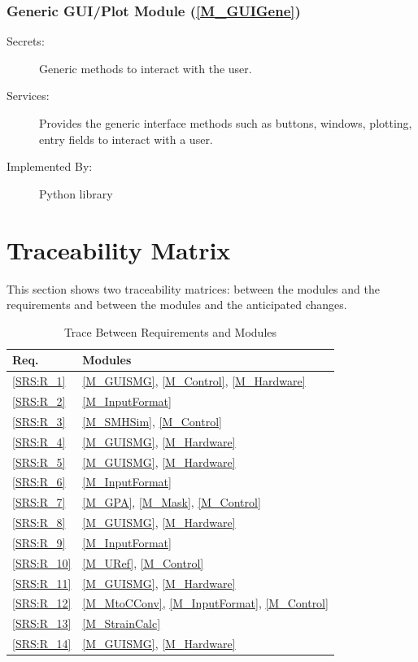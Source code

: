 \documentclass[12pt, titlepage]{article}
\begin{document}
\subsubsection{Generic GUI/Plot Module (\texorpdfstring{\cref{M_GUIGene}}))}
\label{MG_GUIGene}
\begin{description}
\item[Secrets:] Generic methods to interact with the user.
\item[Services:] Provides the generic interface methods such as buttons, 
windows, plotting, entry fields to interact with a user.
\item[Implemented By:] Python library
\end{description}

\section{Traceability Matrix} \label{SecTM}

This section shows two traceability matrices: between the modules and the
requirements and between the modules and the anticipated changes.

\begin{table}[H]
\centering
\begin{tabular}{p{} p{}}
\toprule
\textbf{Req.} & \textbf{Modules}\\
\midrule
\cref{SRS:R_1} & \cref{M_GUISMG}, \cref{M_Control}, \cref{M_Hardware} \\
\cref{SRS:R_2} & \cref{M_InputFormat} \\
\cref{SRS:R_3} & \cref{M_SMHSim}, \cref{M_Control} \\
\cref{SRS:R_4} & \cref{M_GUISMG}, \cref{M_Hardware} \\
\cref{SRS:R_5} & \cref{M_GUISMG}, \cref{M_Hardware} \\
\cref{SRS:R_6} & \cref{M_InputFormat} \\
\cref{SRS:R_7} & \cref{M_GPA}, \cref{M_Mask}, \cref{M_Control} \\
\cref{SRS:R_8} & \cref{M_GUISMG}, \cref{M_Hardware} \\
\cref{SRS:R_9} & \cref{M_InputFormat} \\
\cref{SRS:R_10} & \cref{M_URef}, \cref{M_Control} \\
\cref{SRS:R_11} & \cref{M_GUISMG}, \cref{M_Hardware} \\
\cref{SRS:R_12} & \cref{M_MtoCConv}, \cref{M_InputFormat}, \cref{M_Control} \\
\cref{SRS:R_13} & \cref{M_StrainCalc} \\
\cref{SRS:R_14} & \cref{M_GUISMG}, \cref{M_Hardware}\\
\bottomrule
\end{tabular}
\caption{Trace Between Requirements and Modules}
\label{TblRT}
\end{table}
\end{document}

